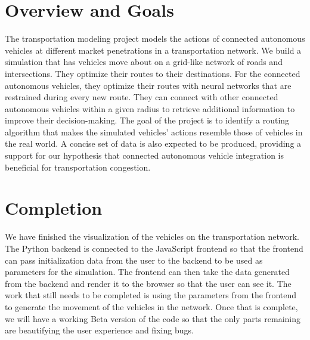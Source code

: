 \documentclass[onecolumn, draftclsnofoot,10pt, compsoc]{IEEEtran}
\begin{document}
\section{Overview and Goals}
The transportation modeling project models the actions of connected autonomous vehicles at different market penetrations in a transportation network. We build a simulation that has vehicles move about on a grid-like network of roads and intersections. They optimize their routes to their destinations. For the connected autonomous vehicles, they optimize their routes with neural networks that are restrained during every new route. They can connect with other connected autonomous vehicles within a given radius to retrieve additional information to improve their decision-making. The goal of the project is to identify a routing algorithm that makes the simulated vehicles’ actions resemble those of vehicles in the real world. A concise set of data is also expected to be produced, providing a support for our hypothesis that connected autonomous vehicle integration is beneficial for transportation congestion.
\section{Completion}
We have finished the visualization of the vehicles on the transportation network. The Python backend is connected to the JavaScript frontend so that the frontend can pass initialization data from the user to the backend to be used as parameters for the simulation. The frontend can then take the data generated from the backend and render it to the browser so that the user can see it. The work that still needs to be completed is using the parameters from the frontend to generate the movement of the vehicles in the network. Once that is complete, we will have a working Beta version of the code so that the only parts remaining are beautifying the user experience and fixing bugs.
\end{document}

